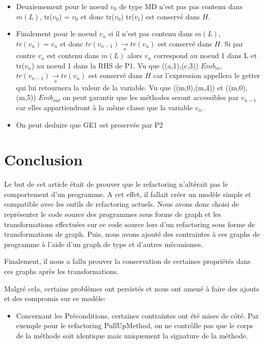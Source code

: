 \documentclass[a4paper, 12pt]{article}
\begin{document}
{\begin{enumerate}
\begin{itemize}[label=\textbullet]
      \item Deuxiemement pour le noeud {$v_0$} de type MD n'est pas pas contenu dans $m(L)$, tr({$v_0$}) = {$v_0$} et donc tr({$v_0$})  tr({$v_1$}) est conservé dans $H$.

      \item  Finalement pour le noeud {$v_n$} si il n'est pas contenu dans $m(L)$, $tr(v_n)= v_n$ et donc $tr(v_{n-1}) \underset{a}{\rightarrow} tr(v_n)$ est conservé dans $H$.
      Si par contre {$v_n$} est contenu dans $m(L)$ alors {$v_n$} correspond au noeud 1 dans L et tr($v_n$) au noeud 1 dans la RHS de P1.
      Vu que ((a,1),(c,3)) \in $Emb_{in}$, $tr(v_{n-1}) \underset{a}{\rightarrow} tr(v_n)$ est conservé dans $H$ car l'expression appellera le getter qui lui retournera la valeur de la variable.
      Vu que ((m,0),(m,4)) et ((m,0),(m,5)) \in $Emb_{out}$ on peut garantir que les méthodes seront accessibles par $v_{n-1}$ car elles appartiendront à la même classe que la variable $v_n$.

      \item On peut deduire que GE1 est preservée par P2
    \end{itemize}

  \end{enumerate}

  \section{Conclusion}

  Le but de cet article était de prouver que le refactoring n'altérait pas le comportement d'un programme.
  A cet effet, il fallait créer un modèle simple et compatible avec les outils de refactoring actuels. Nous avons donc choisi de représenter le code source des programmes sous forme de graph
  et les transformations effectuées sur ce code source lors d'un refactoring sous forme de transformations de graph.
  Puis, nous avons ajouté des contraintes à ces graphs de programme à l'aide d'un graph de type et d'autres mécanismes.

  Finalement, il nous a fallu prouver la conservation de certaines propriétés dans ces graphs après les transformations.

  Malgré cela, certains problèmes ont persistés et nous ont amené à faire des ajouts et des compromis sur ce modèle:

  \begin{itemize}[label=\textbullet]
    \item Concernant les Préconditions, certaines contraintes ont été mises de côté. Par exemple pour le refactoring PullUpMethod, on ne contrôlle pas que le corps de la méthode soit identique mais uniquement la signature de la méthode.


\end{itemize}}
\end{document}

